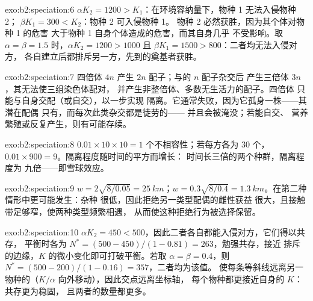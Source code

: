 \begin{solution}{exo:b2:speciation:6}
$\alpha K_2 = 1200 > K_1$：在环境容纳量下，物种 1 无法入侵物种 2；
$\beta K_1 = 300 < K_2$：物种 2 可入侵物种 1。
物种 2 必然获胜，因为其个体对物种 1 的危害
大于物种 1 自身个体造成的危害，而其自身几乎
不受影响。取 $\alpha = \beta = 1.5$ 时，$\alpha K_2 = 1200 > 1000$
且 $\beta K_1 = 1500 > 800$：二者均无法入侵对方，
各自建立后都排斥另一方，先到的奠基者获胜。
\end{solution}

\begin{solution}{exo:b2:speciation:7}
四倍体 $4n$ 产生 $2n$ 配子；与的 $n$ 配子杂交后
产生三倍体 $3n$，其无法使三组染色体配对，
并产生非整倍体、多数无生活力的配子。四倍体
只能与自身交配（或自交），以一步实现
隔离。它通常失败，因为它孤身一株——其潜在配偶
只有，而每次此类杂交都是徒劳的——
并且会被淹没；若能自交、
营养繁殖或反复产生，则有可能存续。
\end{solution}

\begin{solution}{exo:b2:speciation:8}
$0.01\times 10\times 10 = 1$ 个不相容性；若每方各为 30 个，$0.01\times
900 = 9$。隔离程度随时间的平方而增长：
时间长三倍的两个种群，隔离程度为
九倍——即雪球效应。
\end{solution}

\begin{solution}{exo:b2:speciation:9}
$w = 2\sqrt{8/0.05} = \qty{25}{km}$；$w = 0.3\sqrt{8/0.4} =
\qty{1.3}{km}$。在第二种情形中更可能发生：杂种
很低，因此拒绝另一类型配偶的雌性获益
很大，且接触带足够窄，使两种类型频繁相遇，
从而使这种拒绝行为被选择保留。
\end{solution}

\begin{solution}{exo:b2:speciation:10}
$\alpha K_2 = 450 < 500$，因此二者各自都能入侵对方，它们得以共存，
平衡时各为 $N^{*} = (500 - 450)/(1 - 0.81) = 263$，勉强共存，接近
排斥的边缘，$K$ 的微小变化即可打破平衡。若取
$\alpha = \beta = 0.4$，则 $N^{*} = (500 - 200)/(1 - 0.16) = 357$，二者均为该值。
使每条等斜线远离另一物种的（$K/\alpha$
向外移动），因此交点远离坐标轴，
每个物种都更接近自身的 $K$：共存更为稳固，
且两者的数量都更多。
\end{solution}

